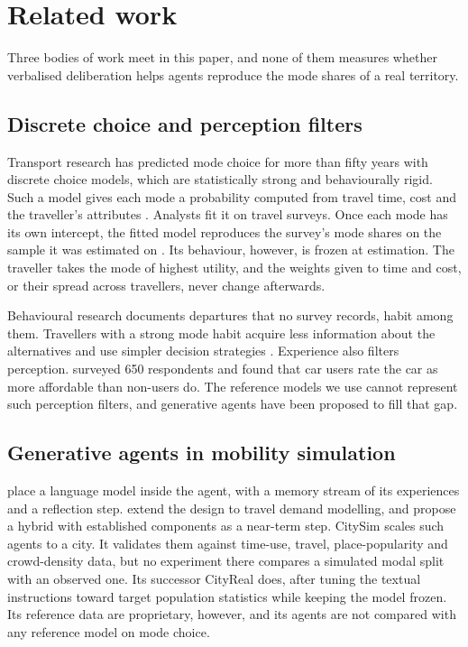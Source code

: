 \section{Related work}
\label{sec:related}

Three bodies of work meet in this paper, and none of them measures whether verbalised
deliberation helps agents reproduce the mode shares of a real territory.

\subsection{Discrete choice and perception filters}
\label{sec:discrete-choice}

Transport research has predicted mode choice for more than fifty years with discrete choice
models, which are statistically strong and behaviourally rigid. Such a model gives each mode a
probability computed from travel time, cost and the traveller's attributes
\citep{mcfadden1974conditional,benakiva1985discrete}. Analysts fit it on travel surveys. Once
each mode has its own intercept, the fitted model reproduces the survey's mode shares on the
sample it was estimated on \citep{train2009discrete}. Its behaviour, however, is frozen at
estimation. The traveller takes the mode of highest utility, and the weights given to time and
cost, or their spread across travellers, never change afterwards.

Behavioural research documents departures that no survey records, habit among them.
Travellers with a strong mode habit acquire less information about the alternatives and use
simpler decision strategies \citep{verplanken1997habit}. Experience also filters perception.
\citet{adam2025survey} surveyed 650 respondents and found that car users rate the car as more
affordable than non-users do. The reference models we use cannot represent such
perception filters, and generative agents have been proposed to fill that gap.

\subsection{Generative agents in mobility simulation}
\label{sec:generative-mobility}

\citet{park2023generative} place a language model inside the agent, with a memory stream of
its experiences and a reflection step. \citet{liu2024toward} extend the design to travel
demand modelling, and propose a hybrid with established components as a near-term step.
CitySim \citep{bougie2025citysim} scales such agents to a city. It validates them against
time-use, travel, place-popularity and crowd-density data, but no experiment there compares a
simulated modal split with an observed one. Its successor CityReal \citep{bougie2026cityreal}
does, after tuning the textual instructions toward target population statistics while keeping
the model frozen. Its reference data are proprietary, however, and its agents are not compared
with any reference model on mode choice.

